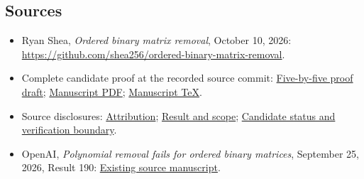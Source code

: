 \documentclass[11pt]{article}
\begin{document}
\subsection{Sources}
\begin{itemize}
 \item Ryan Shea, \emph{Ordered binary matrix removal}, October 10, 2026:
       \url{https://github.com/shea256/ordered-binary-matrix-removal}.
 \item Complete candidate proof at the recorded source commit:
       \href{https://github.com/shea256/ordered-binary-matrix-removal/blob/5aae39b6015677a4fba98e402fa576b22d3b10f9/proofs/five-by-five.md}{Five-by-five proof draft};
       \href{https://github.com/shea256/ordered-binary-matrix-removal/blob/5aae39b6015677a4fba98e402fa576b22d3b10f9/manuscript.pdf}{Manuscript PDF};
       \href{https://github.com/shea256/ordered-binary-matrix-removal/blob/5aae39b6015677a4fba98e402fa576b22d3b10f9/tex/manuscript.tex}{Manuscript TeX}.
 \item Source disclosures:
       \href{https://github.com/shea256/ordered-binary-matrix-removal/blob/5aae39b6015677a4fba98e402fa576b22d3b10f9/ATTRIBUTION.md}{Attribution};
       \href{https://github.com/shea256/ordered-binary-matrix-removal/blob/5aae39b6015677a4fba98e402fa576b22d3b10f9/RESULT.md}{Result and scope};
       \href{https://github.com/shea256/ordered-binary-matrix-removal/blob/5aae39b6015677a4fba98e402fa576b22d3b10f9/results/current.json}{Candidate status and verification boundary}.
 \item OpenAI, \emph{Polynomial removal fails for ordered binary matrices},
       September 25, 2026, Result 190:
       \href{https://github.com/openai/math/blob/adc7f1241b42e322a6451854ab7e4b4c146bf78a/preprints/Polynomial-removal-fails-for-ordered-binary-matrices-September-25-2026/paper.pdf}{Existing source manuscript}.
\end{itemize}
\end{document}
